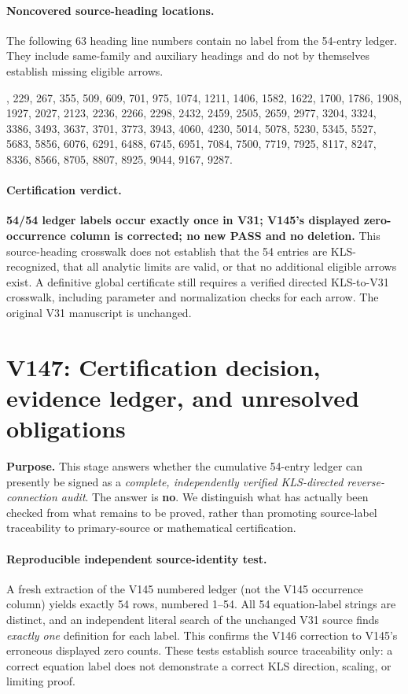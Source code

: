 \documentclass[11pt]{article}
\begin{document}
\paragraph{Noncovered source-heading locations.} The following 63 heading line numbers contain no label from the 54-entry ledger. They include same-family and auxiliary headings and do not by themselves establish missing eligible arrows.\par
\begingroup\small{}, 229, 267, 355, 509, 609, 701, 975, 1074, 1211, 1406, 1582, 1622, 1700, 1786, 1908, 1927, 2027, 2123, 2236, 2266, 2298, 2432, 2459, 2505, 2659, 2977, 3204, 3324, 3386, 3493, 3637, 3701, 3773, 3943, 4060, 4230, 5014, 5078, 5230, 5345, 5527, 5683, 5856, 6076, 6291, 6488, 6745, 6951, 7084, 7500, 7719, 7925, 8117, 8247, 8336, 8566, 8705, 8807, 8925, 9044, 9167, 9287.\par\endgroup

\paragraph{Certification verdict.} \textbf{54/54 ledger labels occur exactly once in V31; V145's displayed zero-occurrence column is corrected; no new PASS and no deletion.} This source-heading crosswalk does not establish that the 54 entries are KLS-recognized, that all analytic limits are valid, or that no additional eligible arrows exist. A definitive global certificate still requires a verified directed KLS-to-V31 crosswalk, including parameter and normalization checks for each arrow. The original V31 manuscript is unchanged.


\clearpage
\section{V147: Certification decision, evidence ledger, and unresolved obligations}
\label{sec:v147-certification-boundary}
\noindent\textbf{Purpose.} This stage answers whether the cumulative 54-entry ledger can presently be signed as a \emph{complete, independently verified KLS-directed reverse-connection audit}. The answer is \textbf{no}. We distinguish what has actually been checked from what remains to be proved, rather than promoting source-label traceability to primary-source or mathematical certification.

\paragraph{Reproducible independent source-identity test.} A fresh extraction of the V145 numbered ledger (not the V145 occurrence column) yields exactly 54 rows, numbered 1--54. All 54 equation-label strings are distinct, and an independent literal search of the unchanged V31 source finds \emph{exactly one} definition for each label. This confirms the V146 correction to V145's erroneous displayed zero counts. These tests establish source traceability only: a correct equation label does not demonstrate a correct KLS direction, scaling, or limiting proof.
\end{document}

